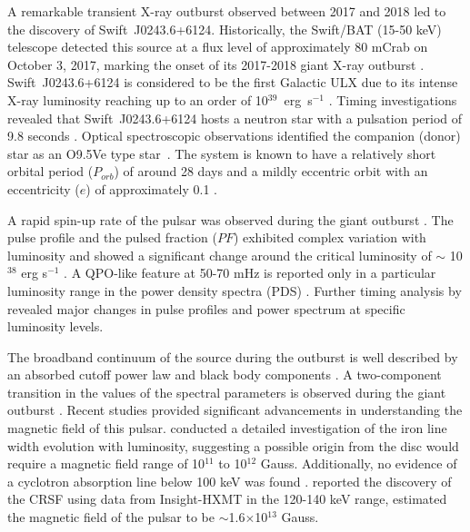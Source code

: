 \documentclass[twocolumn,trackchanges]{aastex631}
\begin{document}
A remarkable transient X-ray outburst observed between 2017 and 2018 led to the discovery of Swift~J0243.6+6124. Historically, the Swift/BAT (15-50 keV) telescope detected this source at a flux level of approximately 80 mCrab on October 3, 2017, marking the onset of its 2017-2018 giant X-ray outburst \citep{2017ATel10809....1K}. Swift~J0243.6+6124 is considered to be the first Galactic ULX due to its intense X-ray luminosity reaching up to an order of 10$^{39}$~erg~s$^{-1}$ \citep{2018ApJ...863....9W,2019ApJ...885...18J,2020MNRAS.491.1857D}. Timing investigations revealed that Swift~J0243.6+6124 hosts a neutron star with a pulsation period of 9.8 seconds \citep{2017ATel10809....1K,2017ATel10812....1J,2018MNRAS.474.4432J}. Optical spectroscopic observations identified the companion (donor) star as an O9.5Ve type star~\citep{2017ATel10822....1K, 2020A&A...640A..35R}. The system is known to have a relatively short orbital period ($P_{orb}$) of around 28 days and a mildly eccentric orbit with an eccentricity ($e$) of approximately 0.1 \citep{2018A&A...613A..19D,2018ApJ...863....9W}. 


A rapid spin-up rate of the pulsar was observed during the giant outburst \citep{2018A&A...613A..19D}. The pulse profile and the pulsed fraction ($PF$)  exhibited complex variation with luminosity and showed a significant change around the critical luminosity of $\sim$ 10$^{38}$ erg s$^{-1}$  \citep{2018ApJ...863....9W,2018MNRAS.479L.134T}. A QPO-like feature at 50-70 mHz is reported only in a particular luminosity range in the power density spectra (PDS) \citep{2018ApJ...863....9W}. Further timing analysis by \citet{2020MNRAS.491.1857D} revealed major changes in pulse profiles and power spectrum at specific luminosity levels. 

The broadband continuum of the source during the outburst is well described by an absorbed cutoff power law and black body components \citep{2018MNRAS.474.4432J}. A two-component transition in the values of the spectral parameters is observed during the giant outburst \citep{2020ApJ...902...18K}. Recent studies provided significant advancements in understanding the magnetic field of this pulsar. \citet{2019ApJ...885...18J} conducted a detailed investigation of the iron line width evolution with luminosity, suggesting a possible origin from the disc would require a magnetic field range of 10$^{11}$ to 10$^{12}$ Gauss. Additionally, no evidence of a cyclotron absorption line below 100 keV was found \citep{2018MNRAS.474.4432J,2021MNRAS.500..565B}. \citet{2022ApJ...933L...3K} reported the discovery of the CRSF using data from Insight-HXMT in the 120-140 keV range, estimated the magnetic field of the pulsar to be $\sim$1.6$\times$10$^{13}$ Gauss.
\end{document}
